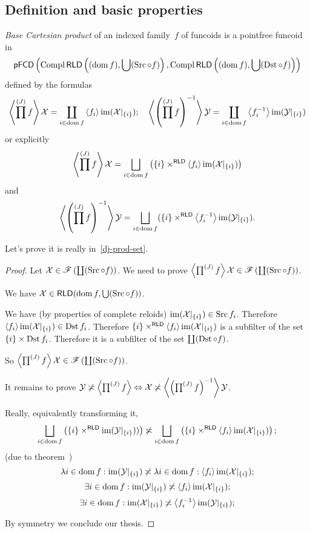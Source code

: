 \subsection{Definition and basic properties}

\begin{defn}
\emph{Base Cartesian product} of an indexed family~$f$ of funcoids is
a pointfree funcoid in
\begin{equation}\label{dj-prod-set}
\mathsf{pFCD}\left(\operatorname{Compl}\mathsf{RLD}\left((\operatorname{dom} f),\bigcup(\operatorname{Src}\circ f)\right), \operatorname{Compl}\mathsf{RLD}\left((\operatorname{dom} f),\bigcup(\operatorname{Dst}\circ f)\right)\right)
\end{equation}
defined by the formulas
\[
\left\langle \prod^{(J)}f\right\rangle \mathcal{X} =
\coprod_{i\in\operatorname{dom} f}\left\langle f_i\right\rangle\operatorname{im}(\mathcal{X}|_{\{i\}});\quad
\left\langle \left(\prod^{(J)}f\right)^{-1}\right\rangle \mathcal{Y} =
\coprod_{i\in\operatorname{dom} f}\left\langle f_i^{-1}\right\rangle\operatorname{im}(\mathcal{Y}|_{\{i\}})
\]
or explicitly
\[
\supfun{\prod^{(J)}f} \mathcal{X} =
\bigsqcup_{i\in\dom f}
\left(\{i\}\times^{\mathsf{RLD}}\supfun{f_i}\im(\mathcal{X}|_{\{i\}})\right)
\]
and
\[
\supfun{\left(\prod^{(J)}f\right)^{-1}} \mathcal{Y} =
\bigsqcup_{i\in\dom f}
(\{i\}\times^{\mathsf{RLD}}\supfun{f_i^{-1}}\im(\mathcal{Y}|_{\{i\}}).
\]
\end{defn}

Let's prove it is really in~\eqref{dj-prod-set}.

\begin{proof}
Let $\mathcal{X}\in\mathscr{F}\left(\coprod(\operatorname{Src}\circ f)\right)$.
We need to prove
$\left\langle \prod^{(J)}f\right\rangle \mathcal{X}\in\mathscr{F}\left(\coprod(\operatorname{Src}\circ f)\right)$.

We have $\mathcal{X}\in\mathsf{RLD}(\operatorname{dom} f, \bigcup(\operatorname{Src}\circ f))$.

We have (by properties of complete reloids) $\operatorname{im}(\mathcal{X}|_{\{i\}})\in\operatorname{Src} f_i$. Therefore $\left\langle f_i\right\rangle\operatorname{im}(\mathcal{X}|_{\{i\}})\in\operatorname{Dst} f_i$. Therefore
$\{i\}\times^{\mathsf{RLD}}\left\langle f_i\right\rangle\operatorname{im}(\mathcal{X}|_{\{i\}})$ is a subfilter of the set $\{i\}\times\operatorname{Dst} f_i$. Therefore it is a subfilter of the set $\coprod(\operatorname{Dst}\circ f)$.

So $\left\langle \prod^{(J)}f\right\rangle \mathcal{X}\in\mathscr{F}\left(\coprod(\operatorname{Src}\circ f)\right)$.

It remains to prove
$\mathcal{Y}\not\asymp\left\langle \prod^{(J)}f\right\rangle \Leftrightarrow
\mathcal{X}\not\asymp\left\langle \left(\prod^{(J)}f\right)^{-1}\right\rangle \mathcal{Y}$.

Really, equivalently transforming it, \[ \bigsqcup_{i\in\dom f}
\left(\{i\}\times^{\mathsf{RLD}}\im(\mathcal{Y}|_{\{i\}}))\right) \nasymp \bigsqcup_{i\in\dom f}
\left(\{i\}\times^{\mathsf{RLD}}\supfun{f_i}\im(\mathcal{X}|_{\{i\}})\right); \]
(due to theorem~)
\[
\lambda i\in\operatorname{dom} f:\operatorname{im}(\mathcal{Y}|_{\{i\}}) \not\asymp
\lambda i\in\operatorname{dom} f:\left\langle f_i\right\rangle\operatorname{im}(\mathcal{X}|_{\{i\}});
\]
\[
\exists i\in\operatorname{dom} f:\operatorname{im}(\mathcal{Y}|_{\{i\}}) \not\asymp
\left\langle f_i\right\rangle\operatorname{im}(\mathcal{X}|_{\{i\}});
\]
\[
\exists i\in\operatorname{dom} f:\operatorname{im}(\mathcal{X}|_{\{i\}}) \not\asymp
\left\langle f_i^{-1}\right\rangle\operatorname{im}(\mathcal{Y}|_{\{i\}});
\]

By symmetry we conclude our thesis.
\end{proof}

